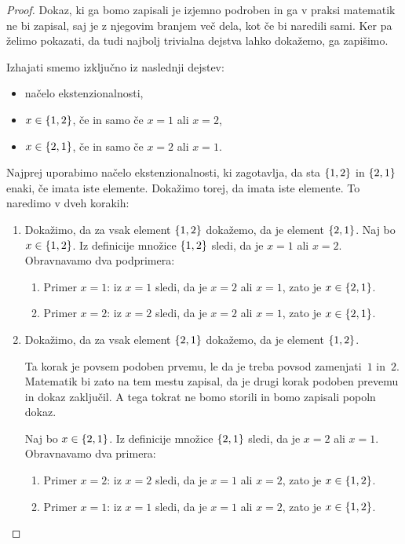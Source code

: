 \begin{proof}
  Dokaz, ki ga bomo zapisali je izjemno podroben in ga v praksi matematik ne bi zapisal,
  saj je z njegovim branjem več dela, kot če bi naredili sami. Ker pa želimo pokazati, da
  tudi najbolj trivialna dejstva lahko dokažemo, ga zapišimo.

  Izhajati smemo izključno iz naslednji dejstev:
  \begin{itemize}
  \item načelo ekstenzionalnosti,
  \item $x \in \set{1, 2}$, če in samo če $x = 1$ ali $x = 2$,
  \item $x \in \set{2, 1}$, če in samo če $x = 2$ ali $x = 1$.
  \end{itemize}
  Najprej uporabimo načelo ekstenzionalnosti, ki zagotavlja, da sta $\set{1, 2}$ in
  $\set{2, 1}$ enaki, če imata iste elemente. Dokažimo torej, da imata iste elemente. To
  naredimo v dveh korakih:
  \begin{enumerate}
  \item Dokažimo, da za vsak element $\set{1, 2}$ dokažemo, da je element $\set{2, 1}$.
    Naj bo $x \in \set{1, 2}$. Iz definicije množice $\set{1, 2}$
    sledi, da je $x = 1$ ali $x = 2$. Obravnavamo dva podprimera:
    \begin{enumerate}
    \item Primer $x = 1$: iz $x = 1$ sledi, da je $x = 2$ ali $x = 1$, zato je $x \in \set{2, 1}$.
    \item Primer $x = 2$: iz $x = 2$ sledi, da je $x = 2$ ali $x = 1$, zato je $x \in \set{2, 1}$.
    \end{enumerate}
  \item Dokažimo, da za vsak element $\set{2, 1}$ dokažemo, da je element $\set{1, 2}$.

    Ta korak je povsem podoben prvemu, le da je treba povsod zamenjati~$1$ in~$2$.
    Matematik bi zato na tem mestu zapisal, da je drugi korak podoben prevemu in dokaz
    zaključil. A tega tokrat ne bomo storili in bomo zapisali popoln dokaz.

    Naj bo $x \in \set{2, 1}$. Iz definicije množice $\set{2, 1}$ sledi, da je $x = 2$ ali
    $x = 1$. Obravnavamo dva primera:
    \begin{enumerate}
    \item Primer $x = 2$: iz $x = 2$ sledi, da je $x = 1$ ali $x = 2$, zato je $x \in \set{1, 2}$.
    \item Primer $x = 1$: iz $x = 1$ sledi, da je $x = 1$ ali $x = 2$, zato je $x \in \set{1, 2}$. \qedhere
    \end{enumerate}
  \end{enumerate}
\end{proof}

